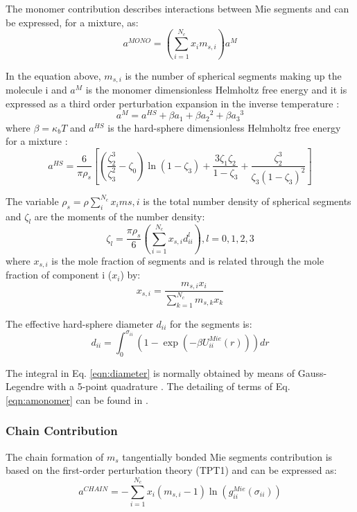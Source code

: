 The monomer contribution describes interactions between Mie segments and can be expressed, for a mixture, as:
\begin{equation}
a^{MONO} = \left(\sum_{i=1}^{N_{c}} x_{i}m_{s,i} \right)a^{M}
\label{eqn:amonomer}
\end{equation}

In the equation above, $m_{s,i}$ is the number of spherical segments making up the molecule i and $a^{M}$  is the monomer dimensionless Helmholtz free energy and it is expressed as a third order perturbation expansion in the inverse temperature \cite{bh1976}:
\begin{equation}
a^{M} = a^{HS}+\beta{a_{1}}+\beta{a_{2}}^2+\beta{a_{3}}^3 
\label{eqn:aM}
\end{equation}
where $\beta=\kappa_{b}T$ and $a^{HS}$ is the hard-sphere dimensionless Helmholtz free energy for a mixture :
\begin{equation}
a^{HS} = \frac{6}{\pi\rho_{s}}\left[\left(\frac{\zeta^3_2}{\zeta^2_3}-\zeta_0 \right)\ln(1-\zeta_3)+\frac{3\zeta_{1}\zeta_{2}}{1-\zeta_3}+ \frac{\zeta^3_2}{\zeta_{3}(1-\zeta_3)^2}\right]
\label{eqn:hs}
\end{equation}

The variable $\rho_{s}=\rho\sum_{i}^{N_c} x_{i}m{s,i}$ is the total number density of spherical segments and $\zeta_l$ are the moments of the number density:
\begin{equation}
\zeta_l = \frac{\pi\rho_s}{6}\left(\sum_{i=1}^{N_c} x_{s,i}d^l_{ii} \right), l = 0,1,2,3
\label{eqn:zetal}
\end{equation}
where $x_{s,i}$ is the mole fraction of segments and is related through the mole fraction of component i ($x_i$) by:
\begin{equation}
x_{s,i} = \frac{m_{s,i}x_i}{\sum_{k=1}^{N_c} m_{s,k}x_{k} }
\label{eqn:xsi}
\end{equation}


The effective hard-sphere diameter $d_{ii}$ for the segments is:
\begin{equation}
d_{ii} =\int_{0}^{\sigma_{ii}} ( 1 - \exp(-\beta U^{Mie}_{ii}(r)) ) dr
\label{eqn:diameter}
\end{equation}


The integral in Eq. \eqref{eqn:diameter} is normally obtained by means of Gauss-Legendre with a 5-point quadrature \cite{papa2014}. The detailing of terms of Eq. \eqref{eqn:amonomer} can be found in .

\subsubsection{Chain Contribution}
The chain formation of $m_{s}$ tangentially bonded Mie segments contribution is based on the first-order perturbation theory (TPT1)  \cite{papa2014} and can be expressed as:
\begin{equation}
a^{CHAIN} =-\sum_{i=1}^{N_{c}} x_{i}(m_{s,i} - 1)\ln(g_{ii}^{Mie}(\sigma_{ii}))
\label{eqn:achain}
\end{equation}



